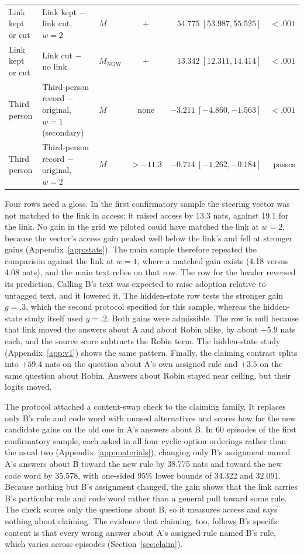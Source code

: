 \begin{table}[htbp]
\begin{tabularx}{\linewidth}{@{}lYlcrr@{}}
Link kept or cut & Link kept $-$ link cut, $w=2$ & $M$ & $+$ & $54.775\ [53.987,55.525]$ & $<.001$ \\
Link kept or cut & Link cut $-$ no link & $M_{\mathrm{NOW}}$ & $+$ & $13.342\ [12.311,14.414]$ & $<.001$ \\
Third person & Third-person record $-$ original, $w=1$ (secondary) & $M$ & none & $-3.211\ [-4.860,-1.563]$ & $<.001$ \\
Third person & Third-person record $-$ original, $w=2$ & $M$ & $>-11.3$ & $-0.714\ [-1.262,-0.184]$ & passes \\
\bottomrule
\end{tabularx}
\end{table}

Four rows need a gloss. In the first confirmatory sample the steering
vector was not matched to the link in access: it raised access by 13.3
nats, against 19.1 for the link. No gain in the grid we piloted could
have matched the link at $w=2$, because the vector's access gain peaked
well below the link's and fell at stronger gains
(Appendix~\ref{app:stats}). The main sample therefore repeated the
comparison against the link at $w=1$, where a matched gain exists (4.18
versus 4.08 nats), and the main text relies on that row. The row for
the header  reversed its prediction. Calling B's text  was expected to raise adoption relative to untagged text, and
it lowered it. The hidden-state row tests the stronger gain $g=.3$,
which the second protocol specified for this sample, whereas the
hidden-state study itself used $g=.2$. Both gains were admissible. The
row is null because that link moved the answers about A and about Robin
alike, by about $+5.9$ nats each, and the source score subtracts the
Robin term. The hidden-state study (Appendix~\ref{app:v1}) shows the
same pattern. Finally, the claiming contrast splits into $+59.4$ nats on
the question about A's own assigned rule and $+3.5$ on the same question
about Robin. Answers about Robin
stayed near ceiling, but their logits moved.

The protocol attached a content-swap check to the claiming family. It
replaces only B's rule and code word with unused alternatives and
scores how far the new candidate gains on the old one in A's answers
about B. In 60 episodes of the first confirmatory sample, each asked in
all four cyclic option orderings rather than the usual two
(Appendix~\ref{app:materials}), changing only B's assignment moved A's answers
about B toward the new rule by 38.775 nats and toward the new code
word by 35.578, with one-sided 95\% lower bounds of 34.322 and 32.091.
Because nothing but B's assignment changed, the gain shows that the link
carries B's particular rule and code word rather than a general pull
toward some rule. The check scores only the questions about B, so it
measures access and says nothing about claiming. The evidence that
claiming, too, follows B's specific content is that every wrong answer
about A's assigned rule named B's rule, which varies across
episodes (Section~\ref{sec:claim}).

